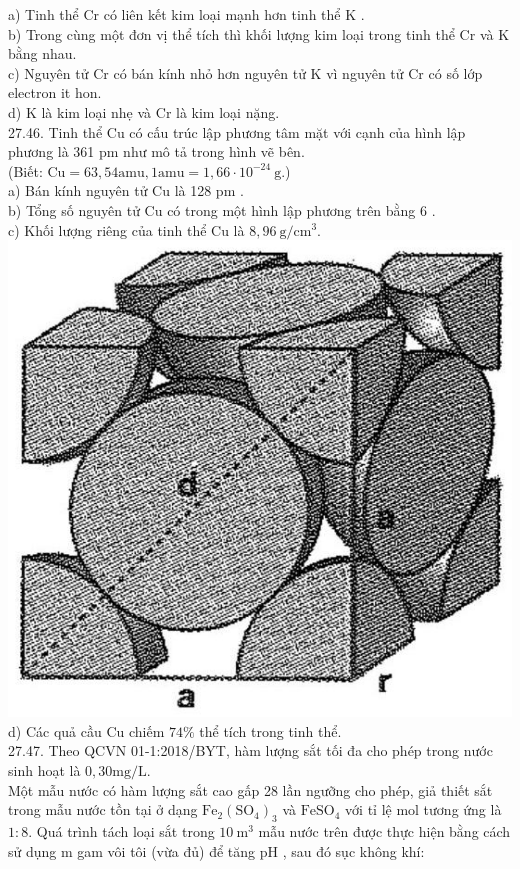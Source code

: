 \documentclass[10pt]{article}
\begin{document}
a) Tinh thể Cr có liên kết kim loại mạnh hơn tinh thể K .\\
b) Trong cùng một đơn vị thể tích thì khối lượng kim loại trong tinh thể Cr và K bằng nhau.\\
c) Nguyên tử Cr có bán kính nhỏ hơn nguyên tử K vì nguyên tử Cr có số lớp electron it hon.\\
d) K là kim loại nhẹ và Cr là kim loại nặng.\\
27.46. Tinh thể Cu có cấu trúc lập phương tâm mặt với cạnh của hình lập phương là 361 pm như mô tả trong hình vẽ bên.\\
(Biết: $\mathrm{Cu}=63,54 \mathrm{amu}, 1 \mathrm{amu}=1,66 \cdot 10^{-24} \mathrm{~g}$.)\\
a) Bán kính nguyên tử Cu là 128 pm .\\
b) Tổng số nguyên tử Cu có trong một hình lập phương trên bằng 6 .\\
c) Khối lượng riêng của tinh thể Cu là $8,96 \mathrm{~g} / \mathrm{cm}^{3}$.\\
\includegraphics[max width=\textwidth, center]{2025_10_23_74efce88ce3a451fd6b0g-100}\\
d) Các quả cầu Cu chiếm $74 \%$ thể tích trong tinh thể.\\
27.47. Theo QCVN 01-1:2018/BYT, hàm lượng sắt tối đa cho phép trong nước sinh hoạt là $0,30 \mathrm{mg} / \mathrm{L}$.\\
Một mẫu nước có hàm lượng sắt cao gấp 28 lần ngưỡng cho phép, giả thiết sắt trong mẫu nước tồn tại ở dạng $\mathrm{Fe}_{2}\left(\mathrm{SO}_{4}\right)_{3}$ và $\mathrm{FeSO}_{4}$ với tỉ lệ mol tương ứng là $1: 8$. Quá trình tách loại sắt trong $10 \mathrm{~m}^{3}$ mẫu nước trên được thực hiện bằng cách sử dụng m gam vôi tôi (vừa đủ) để tăng pH , sau đó sục không khí:
\end{document}
